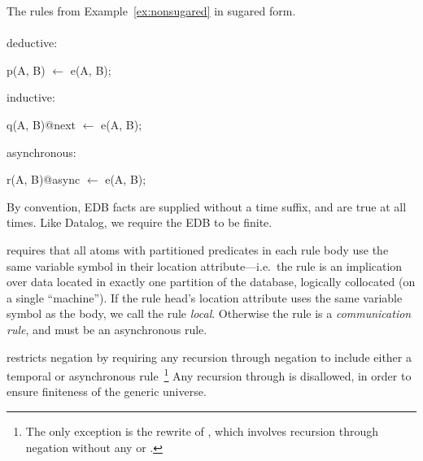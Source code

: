 \begin{example}
\label{ex:sugared}
The rules from Example~\ref{ex:nonsugared} in sugared form.
\\\\
deductive:
\begin{Dedalus}
p(A, B) \(\leftarrow\) e(A, B);
\end{Dedalus}
inductive:
\begin{Dedalus}
q(A, B)@next \(\leftarrow\) e(A, B);
\end{Dedalus}
asynchronous:
\begin{Dedalus}
r(A, B)@async \(\leftarrow\) e(A, B);
\end{Dedalus}
\end{example}



\vspace{1em}
By convention, EDB facts are supplied without a time suffix, and are true at all times.  Like Datalog, we require the EDB to be finite.

\vspace{1em}
\lang requires that all atoms with partitioned predicates in each rule body use the same variable symbol in their location attribute---i.e.\ the rule is an implication over data located in exactly one partition of the database, logically collocated (on a single ``machine'').  If the rule head's location attribute uses the same variable symbol as the body, we call the rule {\em local}.  Otherwise the rule is a {\em communication rule}, and must be an asynchronous rule.                                                              

\vspace{1em}
\lang restricts negation by requiring any recursion through negation to include either a temporal or asynchronous rule~\footnote{The only exception is the rewrite of , which involves recursion through negation without any  or .}  Any recursion through  is disallowed, in order to ensure finiteness of the generic universe.



